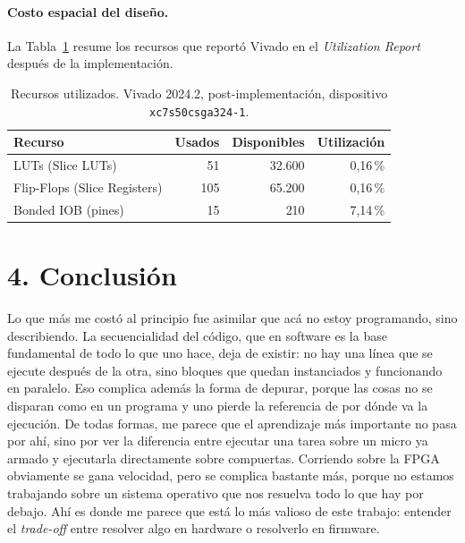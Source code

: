 \documentclass[11pt,a4paper]{article}
\begin{document}
\paragraph{Costo espacial del diseño.}
La Tabla~\ref{tab:util} resume los recursos que reportó Vivado en el \emph{Utilization Report}
después de la implementación.

\begin{table}[h]
\centering
\footnotesize
\caption{Recursos utilizados. Vivado 2024.2, post-implementación, dispositivo
\texttt{xc7s50csga324-1}.}
\label{tab:util}
\begin{tabular}{@{}lrrr@{}}
\toprule
Recurso & Usados & Disponibles & Utilización \\
\midrule
LUTs (Slice LUTs)            &  51 & 32.600 & 0,16\,\% \\
Flip-Flops (Slice Registers) & 105 & 65.200 & 0,16\,\% \\
Bonded IOB (pines)           &  15 &    210 & 7,14\,\% \\
\bottomrule
\end{tabular}
\end{table}


\section*{4. Conclusión}

Lo que más me costó al principio fue asimilar que acá no estoy programando, sino describiendo. La
secuencialidad del código, que en software es la base fundamental de todo lo que uno hace, deja de
existir: no hay una línea que se ejecute después de la otra, sino bloques que quedan instanciados y
funcionando en paralelo. Eso complica además la forma de depurar, porque las cosas no se disparan
como en un programa y uno pierde la referencia de por dónde va la ejecución. De todas formas, me
parece que el aprendizaje más importante no pasa por ahí, sino por ver la diferencia entre ejecutar
una tarea sobre un micro ya armado y ejecutarla directamente sobre compuertas. Corriendo sobre la
FPGA obviamente se gana velocidad, pero se complica bastante más, porque no estamos trabajando
sobre un sistema operativo que nos resuelva todo lo que hay por debajo. Ahí es donde me parece que
está lo más valioso de este trabajo: entender el \emph{trade-off} entre resolver algo en hardware o
resolverlo en firmware.
\end{document}
